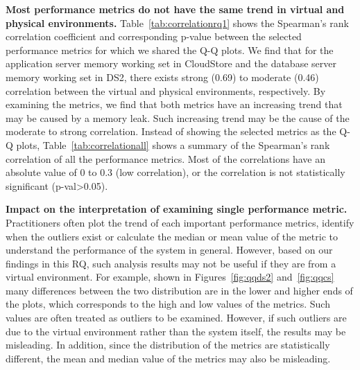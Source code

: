 \documentclass[smallextended]{svjour3}       %
\begin{document}
\noindent \textbf{Most performance metrics do not have the same trend in virtual and physical environments.} Table~\ref{tab:correlationrq1} shows the Spearman's rank correlation coefficient and corresponding p-value between the selected performance metrics for which we shared the Q-Q plots. We find that for the application server memory working set in CloudStore and the database server memory working set in DS2, there exists strong (0.69) to moderate (0.46) correlation between the virtual and physical environments, respectively. By examining the metrics, we find that both metrics have an increasing trend that may be caused by a memory leak. Such increasing trend may be the cause of the moderate to strong correlation. Instead of showing the selected metrics as the Q-Q plots, Table~\ref{tab:correlationall} shows a summary of the Spearman's rank correlation of all the performance metrics. Most of the correlations have an absolute value of 0 to 0.3 (low correlation), or the correlation is not statistically significant (p-val\textgreater0.05).

\noindent \textbf{Impact on the interpretation of examining single performance metric.} Practitioners often plot the trend of each important performance metrics, identify when the outliers exist or calculate the median or mean value of the metric to understand the performance of the system in general. However, based on our findings in this RQ, such analysis results may not be useful if they are from a virtual environment. For example, shown in Figures~\ref{fig:qqds2} and~\ref{fig:qqcs} many differences between the two distribution are in the lower and higher ends of the plots, which corresponds to the high and low values of the metrics. Such values are often treated as outliers to be examined. However, if such outliers are due to the virtual environment rather than the system itself, the results may be misleading. In addition, since the distribution of the metrics are statistically different, the mean and median value of the metrics may also be misleading. 

\noindent{}
\end{document}
